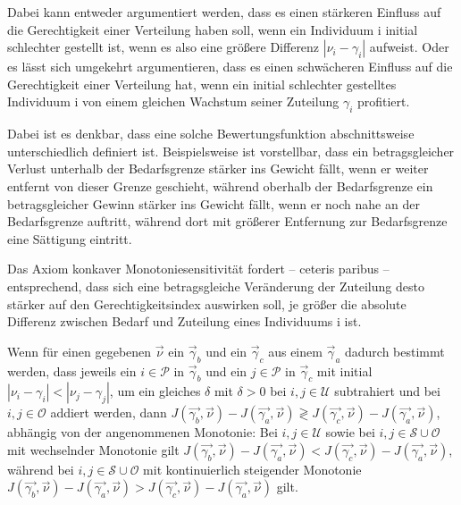 \documentclass[a4paper]{thesis}
\begin{document}
Dabei kann entweder argumentiert werden, dass es einen stärkeren Einfluss auf die Gerechtigkeit einer Verteilung haben soll, wenn ein Individuum i initial schlechter gestellt ist, wenn es also eine größere Differenz $|\nu_i-\gamma_i|$ aufweist. Oder es lässt sich umgekehrt argumentieren, dass es einen schwächeren Einfluss auf die Gerechtigkeit einer Verteilung hat, wenn ein initial schlechter gestelltes Individuum i von einem gleichen Wachstum seiner Zuteilung $\gamma_i$ profitiert.

Dabei ist es denkbar, dass eine solche Bewertungsfunktion abschnittsweise unterschiedlich definiert ist. Beispielsweise ist vorstellbar, dass ein betragsgleicher Verlust unterhalb der Bedarfsgrenze stärker ins Gewicht fällt, wenn er weiter entfernt von dieser Grenze geschieht, während oberhalb der Bedarfsgrenze ein betragsgleicher Gewinn stärker ins Gewicht fällt, wenn er noch nahe an der Bedarfsgrenze auftritt, während dort mit größerer Entfernung zur Bedarfsgrenze eine Sättigung eintritt.

Das Axiom konkaver Monotoniesensitivität fordert -- ceteris paribus -- entsprechend, dass sich eine betragsgleiche Veränderung der Zuteilung desto stärker auf den Gerechtigkeitsindex auswirken soll, je größer die absolute Differenz zwischen Bedarf und Zuteilung eines Individuums i ist.

\begin{Axiom}
Wenn für einen gegebenen $\vec\nu$ ein $\vec\gamma_b$ und ein $\vec\gamma_c$ aus einem $\vec\gamma_a$ dadurch bestimmt werden, dass jeweils ein $i\in\mathcal{P}$ in $\vec\gamma_b$ und ein $j\in\mathcal{P}$ in $\vec\gamma_c$ mit initial $|\nu_i-\gamma_i|<|\nu_j-\gamma_j|$, um ein gleiches $\delta$ mit $\delta>0$ bei $i,j\in\mathcal{U}$ subtrahiert und bei $i,j\in\mathcal{O}$ addiert werden, dann $J(\vec{\gamma_b},\vec{\nu})-J(\vec{\gamma_a},\vec{\nu})\gtrless J(\vec{\gamma_c},\vec{\nu})-J(\vec{\gamma_a},\vec{\nu})$, abhängig von der angenommenen Monotonie: Bei $i,j\in\mathcal{U}$ sowie bei $i,j\in\mathcal{S}\cup\mathcal{O}$ mit wechselnder Monotonie gilt $J(\vec{\gamma_b},\vec{\nu})-J(\vec{\gamma_a},\vec{\nu})<J(\vec{\gamma_c},\vec{\nu})-J(\vec{\gamma_a},\vec{\nu})$, während bei $i,j\in\mathcal{S}\cup\mathcal{O}$ mit kontinuierlich steigender Monotonie $J(\vec{\gamma_b},\vec{\nu})-J(\vec{\gamma_a},\vec{\nu})>J(\vec{\gamma_c},\vec{\nu})-J(\vec{\gamma_a},\vec{\nu})$ gilt.
\end{Axiom}
\end{document}
